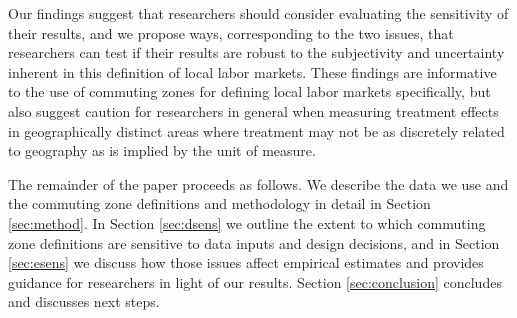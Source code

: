 Our findings suggest that researchers should consider evaluating the sensitivity of their results, and we propose ways, corresponding to the two issues, that researchers can test if their results are robust to the subjectivity and uncertainty inherent in this definition of local labor markets. These findings are informative to the use of commuting zones for defining local labor markets specifically, but also suggest caution for researchers in general when measuring treatment effects in geographically distinct areas where treatment may not be as discretely related to geography as is implied by the unit of measure. 

The remainder of the paper proceeds as follows. We describe the data we use and the commuting zone definitions and methodology in detail in Section \ref{sec:method}. In Section \ref{sec:dsens} we outline the extent to which commuting zone definitions are sensitive to data inputs and design decisions, and in Section \ref{sec:esens} we discuss how those issues affect empirical estimates and provides guidance for researchers in light of our results. Section \ref{sec:conclusion} concludes and discusses next steps. 


